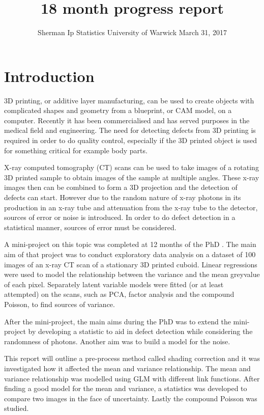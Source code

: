 \documentclass[a4paper]{proc}
\title{18 month progress report}
\author{Sherman Ip \quad Statistics \quad University of Warwick \quad March 31, 2017}
\begin{document}
\maketitle

\begin{abstract}

\end{abstract}

\section{Introduction}
3D printing, or additive layer manufacturing, can be used to create objects with complicated shapes and geometry from a blueprint, or CAM model, on a computer.  Recently it has been commercialised and has served purposes in the medical field and engineering. The need for detecting defects from 3D printing is required in order to do quality control, especially if the 3D printed object is used for something critical for example body parts. 

X-ray computed tomography (CT) scans can be used to take images of a rotating 3D printed sample to obtain images of the sample at multiple angles. These x-ray images then can be combined to form a 3D projection and the detection of defects can start. However due to the random nature of x-ray photons in its production in an x-ray tube and attenuation from the x-ray tube to the detector, sources of error or noise is introduced. In order to do defect detection in a statistical manner, sources of error must be considered.

A mini-project on this topic was completed at 12 months of the PhD \cite{ip2016inside}. The main aim of that project was to conduct exploratory data analysis on a dataset of 100 images of an x-ray CT scan of a stationary 3D printed cuboid. Linear regressions were used to model the relationship between the variance and the mean greyvalue of each pixel. Separately latent variable models were fitted (or at least attempted) on the scans, such as PCA, factor analysis and the compound Poisson, to find sources of variance.

After the mini-project, the main aims during the PhD was to extend the mini-project by developing a statistic to aid in defect detection while considering the randomness of photons. Another aim was to build a model for the noise.

This report will outline a pre-process method called shading correction and it was investigated how it affected the mean and variance relationship. The mean and variance relationship was modelled using GLM with different link functions. After finding a good model for the mean and variance, a statistics was developed to compare two images in the face of uncertainty. Lastly the compound Poisson was studied.
\end{document}
